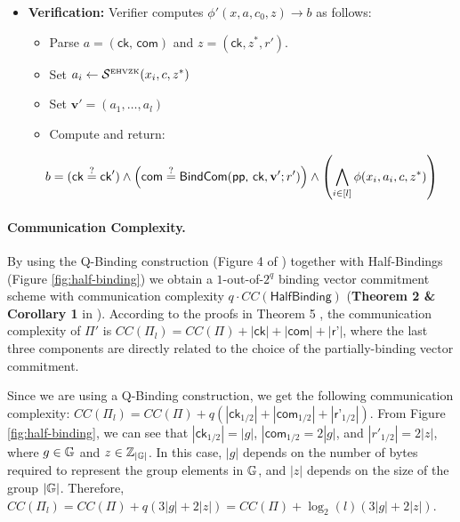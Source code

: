 \begin{protocol}[label={prot:stacksig-compiler}]
\begin{itemize}
\begin{itemize}
        \end{itemize}
      \item \textbf{Verification:} Verifier computes $\phi'(x,a,c_0,z) \rightarrow b$ as follows:
      \begin{itemize}
        \item Parse $a = (\textsf{ck, com})$ and $z = (\textsf{ck}, z^*, r')$.
        \item Set $a_i \leftarrow \mathcal S^{\text{\tiny EHVZK}}(x_i, c, z^*)$
        \item Set $\mathbf{v}' = (a_1, \ldots, a_l)$
        \item Compute and return: 
      \end{itemize}
      \[
          b = (\textsf{ck} \overset {?} {=} \textsf{ck}') \land \left(\textsf{com} \overset {?} {=} \textsf{BindCom}(\textsf{pp, ck}, \mathbf{v}'; r')\right) \land 
          \left(\bigwedge_{i \in [l]} \phi(x_i, a_i, c,z^*)\right)
        \]
  \end{itemize}
\end{protocol}

\paragraph{Communication Complexity.} By using the Q-Binding construction (Figure 4 of \cite{StackingSigmas}) together with Half-Bindings 
(Figure \ref{fig:half-binding}) we obtain a $1$-out-of-$2^q$ 
binding vector commitment scheme with communication complexity $q \cdot CC(\textsf{HalfBinding})$ 
(\textbf{Theorem 2 \& Corollary 1} in \cite{StackingSigmas}). According to the proofs in Theorem 5 \cite{StackingSigmas}, the communication complexity of 
$\Pi'$ is 
$CC(\Pi_l) = CC(\Pi) + |\textsf{ck}| + |\textsf{com}| + |\textsf{r'}|$, where the last three components are directly related to the choice of the 
partially-binding vector commitment. 

Since we are using a Q-Binding construction, we get the following communication complexity: 
$CC(\Pi_l) = CC(\Pi) + q(|\textsf{ck}_{1/2}| + |\textsf{com}_{1/2}| + |\textsf{r'}_{1/2}|)$. From Figure \ref{fig:half-binding}, we can see that 
$|\textsf{ck}_{1/2}| = |g|$, $|\textsf{com}_{1/2} = 2|g|$, and $|r'_{1/2}| = 2|z|$, where $g \in \mathbb{G}$ and $z \in \mathbb{Z}_{|\mathbb{G}|}$. In this case, $|g|$ 
depends on the number of bytes required to represent the group elements in $\mathbb{G}$, and $|z|$ depends on the size of the group $|\mathbb{G}|$. Therefore, 
$CC(\Pi_l) = CC(\Pi) + q(3|g| + 2|z|) = CC(\Pi) + \log_2(l)(3|g| + 2|z|)$.
